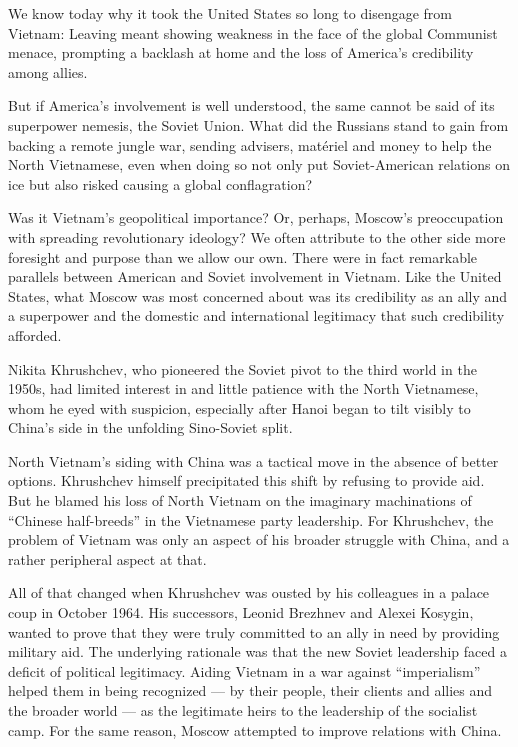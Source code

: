 We know today why it took the United States so long to disengage from
Vietnam: Leaving meant showing weakness in the face of the global
Communist menace, prompting a backlash at home and the loss of America's
credibility among allies.

But if America's involvement is well understood, the same cannot be said
of its superpower nemesis, the Soviet Union. What did the Russians stand
to gain from backing a remote jungle war, sending advisers, matériel and
money to help the North Vietnamese, even when doing so not only put
Soviet-American relations on ice but also risked causing a global
conflagration?

Was it Vietnam's geopolitical importance? Or, perhaps, Moscow's
preoccupation with spreading revolutionary ideology? We often attribute
to the other side more foresight and purpose than we allow our own.
There were in fact remarkable parallels between American and Soviet
involvement in Vietnam. Like the United States, what Moscow was most
concerned about was its credibility as an ally and a superpower and the
domestic and international legitimacy that such credibility afforded.

Nikita Khrushchev, who pioneered the Soviet pivot to the third world in
the 1950s, had limited interest in and little patience with the North
Vietnamese, whom he eyed with suspicion, especially after Hanoi began to
tilt visibly to China's side in the unfolding Sino-Soviet split.

North Vietnam's siding with China was a tactical move in the absence of
better options. Khrushchev himself precipitated this shift by refusing
to provide aid. But he blamed his loss of North Vietnam on the imaginary
machinations of ``Chinese half-breeds'' in the Vietnamese party
leadership. For Khrushchev, the problem of Vietnam was only an aspect of
his broader struggle with China, and a rather peripheral aspect at that.

All of that changed when Khrushchev was ousted by his colleagues in a
palace coup in October 1964. His successors, Leonid Brezhnev and Alexei
Kosygin, wanted to prove that they were truly committed to an ally in
need by providing military aid. The underlying rationale was that the
new Soviet leadership faced a deficit of political legitimacy. Aiding
Vietnam in a war against ``imperialism'' helped them in being recognized
--- by their people, their clients and allies and the broader world ---
as the legitimate heirs to the leadership of the socialist camp. For the
same reason, Moscow attempted to improve relations with China.


